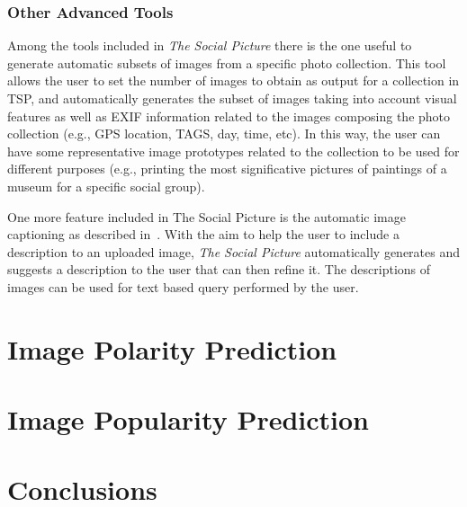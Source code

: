 \subsubsection{Other Advanced Tools}
%
Among the tools included in \textit{The Social Picture} there is the one useful to generate automatic subsets of images from a specific photo collection. This tool allows the user to set the number of images to obtain as output for a collection in TSP, and automatically generates the subset of images taking into account visual features as well as EXIF information related to the images composing the photo collection (e.g., GPS location, TAGS, day, time, etc). In this way, the user can have some representative image prototypes related to the collection to be used for different purposes (e.g., printing the most significative pictures of paintings of a museum for a specific social group).

One more feature included in The Social Picture is the automatic image captioning as described in~\cite{johnson2015densecap}. With the aim to help the user to include a description to an uploaded image, \textit{The Social Picture} automatically generates and suggests a description to the user that can then refine it.  The descriptions of images can be used for text based query performed by the user.


\section{Image Polarity Prediction}\label{(secPolarity)}

\section{Image Popularity Prediction}\label{secPopularity}

\section{Conclusions}
